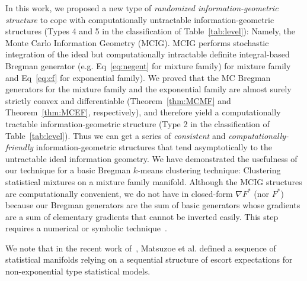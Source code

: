 \documentclass[graybox]{svmult}
\def\tildeD{{\tilde{D}}}
\def\dmu{\mathrm{d}\mu}
\def\eqdef{:=}
\def\calX{\mathcal{X}}
\def\calM{\mathcal{M}}
\begin{document}
In this work, we proposed a new type of {\em randomized
  information-geometric structure} to cope with computationally
untractable information-geometric structures (Types 4 and 5 in the
classification of Table~\ref{tab:level}): Namely, the Monte Carlo Information Geometry (MCIG). MCIG  performs stochastic integration of the ideal but computationally intractable definite integral-based Bregman generator (e.g. Eq~\ref{eq:negent} for mixture family) for mixture family and Eq~\ref{eq:cf} for exponential family).
 We proved that the MC Bregman generators for the mixture family and the exponential family are almost surely strictly convex and differentiable (Theorem~\ref{thm:MCMF} and Theorem~\ref{thm:MCEF}, respectively), and  therefore yield a computationally tractable information-geometric structure (Type 2 in the classification of Table~\ref{tab:level}).
Thus we can get a series of {\em consistent} and {\em computationally-friendly} information-geometric structures that tend asymptotically to the untractable ideal information geometry.
We have demonstrated the usefulness of our technique for a basic Bregman $k$-means clustering technique: Clustering statistical mixtures on a mixture family manifold.
Although the MCIG structures are computationally convenient, we do not
have in closed-form $\nabla F^*$ (nor $F^*$) because our Bregman
generators are the sum of basic generators whose gradients are a sum of elementary gradients that cannot be inverted easily. This step requires a numerical or symbolic technique~\cite{SymbolicMonotoneOp-2017}.

We note that in the recent work of~\cite{matsuzoe-2017},  Matsuzoe et al. defined a sequence of statistical manifolds relying on a sequential structure of escort expectations for non-exponential type statistical models. 
%
\end{document}
